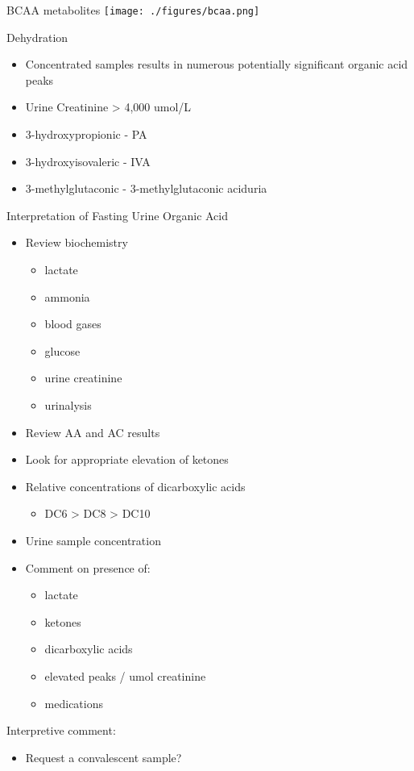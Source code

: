 \documentclass[presentation, smaller]{beamer}
\begin{document}
\begin{frame}[label={sec:orgheadline11}]{BCAA metabolites}
\centering
\texttt{[image: ./figures/bcaa.png]}
\end{frame}

\begin{frame}[label={sec:orgheadline12}]{Dehydration}
\begin{itemize}
\item Concentrated samples results in numerous potentially significant organic acid peaks

\item Urine Creatinine > 4,000 umol/L

\item 3-hydroxypropionic - PA
\item 3-hydroxyisovaleric - IVA
\item 3-methylglutaconic - 3-methylglutaconic aciduria
\end{itemize}
\end{frame}



\begin{frame}[label={sec:orgheadline13}]{Interpretation of Fasting Urine Organic Acid}
\begin{itemize}
\item Review biochemistry
\begin{itemize}
\item lactate
\item ammonia
\item blood gases
\item glucose
\item urine creatinine
\item urinalysis
\end{itemize}
\item Review AA and AC results
\item Look for appropriate elevation of ketones
\item Relative concentrations of dicarboxylic acids
\begin{itemize}
\item DC6 > DC8 > DC10
\end{itemize}
\item Urine sample concentration

\item Comment on presence of:
\begin{itemize}
\item lactate
\item ketones
\item dicarboxylic acids
\item elevated peaks / umol creatinine
\item medications
\end{itemize}
\end{itemize}




Interpretive comment:

\begin{itemize}
\item Request a convalescent sample?
\end{itemize}
\end{frame}
\end{document}
